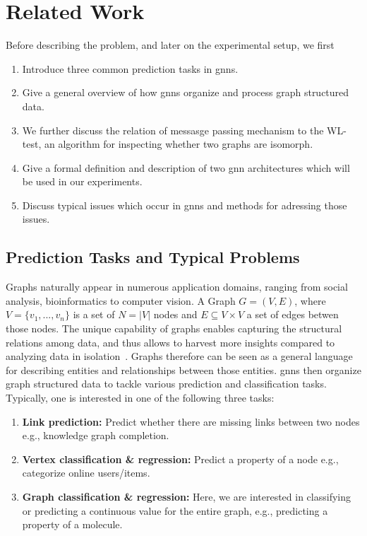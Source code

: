 %
\chapter{Related Work}
\label{sec:related}

Before describing the problem, and later on the experimental setup, we first
\begin{enumerate}
    \item Introduce three common prediction tasks in \acp{gnn}.
    \item Give a general overview of how \acp{gnn} organize and process graph structured data.
    \item We further discuss the relation of messasge passing mechanism to the WL-test, an algorithm for
          inspecting whether two graphs are isomorph.
    \item Give a formal definition and description of two \ac{gnn}
          architectures which will be used in our experiments.
    \item Discuss typical issues which occur in \acp{gnn} and methods for adressing those issues.
\end{enumerate}


\section{Prediction Tasks and Typical Problems}
\label{sec:related:pred}

Graphs naturally appear in numerous application domains, ranging from social analysis, bioinformatics to computer vision.
A Graph $G = (V,E)$, where $V = \{v_{1},...,v_{n}\}$ is a set of $N =|V|$ nodes and $E \subseteq V\times V$ a set of edges betwen those nodes. The unique capability of graphs enables capturing the structural relations among data, and thus allows to harvest more insights compared to analyzing data in isolation~\cite{Zhang19}. Graphs therefore can be seen as a general language for describing entities and relationships between those entities.
\Acfp{gnn} then organize graph structured data to tackle various prediction and classification
tasks. Typically, one is interested in one of the following three tasks:
\begin{enumerate}[label=\textbf{\arabic*.}]
    \item \textbf{Link prediction:}
          Predict whether there are missing links between two nodes
          e.g., knowledge graph completion.

    \item \textbf{Vertex classification \& regression:}
          Predict a property of a node e.g., categorize online users/items.

    \item \textbf{Graph classification \& regression:}
          Here, we are interested in classifying or predicting a continuous value for
          the entire graph, e.g., predicting a property of a molecule.
\end{enumerate}

